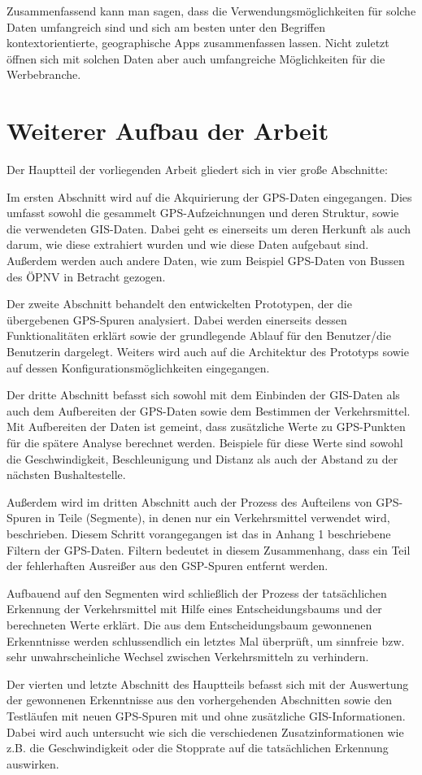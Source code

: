 Zusammenfassend kann man sagen, dass die Verwendungsmöglichkeiten für solche Daten umfangreich sind und sich am besten unter den Begriffen kontextorientierte, geographische Apps zusammenfassen lassen. Nicht zuletzt öffnen sich mit solchen Daten aber auch umfangreiche Möglichkeiten für die Werbebranche.

\section{Weiterer Aufbau der Arbeit}
Der Hauptteil der vorliegenden Arbeit gliedert sich in vier große Abschnitte:

Im ersten Abschnitt wird auf die Akquirierung der GPS-Daten eingegangen. Dies umfasst sowohl die gesammelt GPS-Aufzeichnungen und deren Struktur, sowie die verwendeten GIS-Daten. Dabei geht es einerseits um deren Herkunft als auch darum, wie diese extrahiert wurden und wie diese Daten aufgebaut sind. Außerdem werden auch andere Daten, wie zum Beispiel GPS-Daten von Bussen des ÖPNV in Betracht gezogen.

Der zweite Abschnitt behandelt den entwickelten Prototypen, der die übergebenen GPS-Spuren analysiert. Dabei werden einerseits dessen Funktionalitäten erklärt sowie der grundlegende Ablauf für den Benutzer/die Benutzerin dargelegt. Weiters wird auch auf die Architektur des Prototyps sowie auf dessen Konfigurationsmöglichkeiten eingegangen.

Der dritte Abschnitt befasst sich sowohl mit dem Einbinden der GIS-Daten als auch dem Aufbereiten der GPS-Daten sowie dem Bestimmen der Verkehrsmittel. Mit Aufbereiten der Daten ist gemeint, dass zusätzliche Werte zu GPS-Punkten für die spätere Analyse berechnet werden. Beispiele für diese Werte sind sowohl die Geschwindigkeit, Beschleunigung und Distanz als auch der Abstand zu der nächsten Bushaltestelle. 

Außerdem wird im dritten Abschnitt auch der Prozess des Aufteilens von GPS-Spuren in Teile (Segmente), in denen nur ein Verkehrsmittel verwendet wird, beschrieben. Diesem Schritt vorangegangen ist das in Anhang 1 beschriebene Filtern der GPS-Daten. Filtern bedeutet in diesem Zusammenhang, dass ein Teil der fehlerhaften Ausreißer aus den GSP-Spuren entfernt werden.

Aufbauend auf den Segmenten wird schließlich der Prozess der tatsächlichen Erkennung der Verkehrsmittel mit Hilfe eines Entscheidungsbaums und der berechneten Werte erklärt. Die aus dem Entscheidungsbaum gewonnenen Erkenntnisse werden schlussendlich ein letztes Mal überprüft, um sinnfreie bzw. sehr unwahrscheinliche Wechsel zwischen Verkehrsmitteln zu verhindern. 

Der vierten und letzte Abschnitt des Hauptteils befasst sich mit der Auswertung der gewonnenen Erkenntnisse aus den vorhergehenden Abschnitten sowie den Testläufen mit neuen GPS-Spuren mit und ohne zusätzliche GIS-Informationen. Dabei wird auch untersucht wie sich die verschiedenen Zusatzinformationen wie z.B. die Geschwindigkeit oder die Stopprate auf die tatsächlichen Erkennung auswirken.
